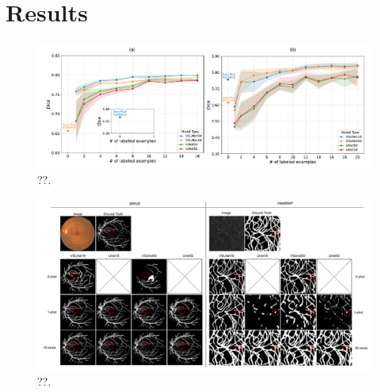 \documentclass[%
reprint,
nofootinbib,
 amsmath,amssymb,
aps,
superscriptaddress,
showkeys,
longbibliography
]{revtex4-1}
\begin{document}
\section{Results}
\label{s:results}

\begin{figure}[tbp]
    \centering
    \includegraphics[width=\textwidth]{figures/results/results_charts.pdf}
    \caption{??.}
    \label{f:results_charts}
\end{figure}


\begin{figure}[tbp]
    \centering
    \includegraphics[width=\textwidth]{figures/results/results_fewshots.pdf}
    \caption{??.}
    \label{f:results_fewshots_drive}
\end{figure}




\end{document}
